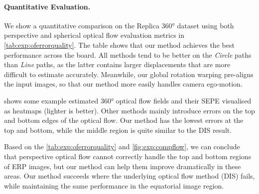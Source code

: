 \paragraph{Quantitative Evaluation.}

We show a quantitative comparison on the Replica 360° dataset using both perspective and spherical optical flow evaluation metrics in \cref{tab:exp:oferrorquality}.
%
The table
shows that our method achieves the best performance across the board.
%
All methods tend to be better on the \emph{Circle} paths than \emph{Line} paths, as the latter contains larger displacements that are more difficult to estimate accurately.
%
Meanwhile, our global rotation warping pre-aligns the input images, so that our method more easily handles camera ego-motion.


 shows some example estimated 360° optical flow fields and their SEPE visualised as heatmaps (lighter is better).
Other methods mainly introduce errors on the top and bottom edges of the optical flow.
Our method has the lowest errors at the top and bottom, while the middle region is quite similar to the DIS result.


Based on the \cref{tab:exp:oferrorquality} and \cref{fig:exp:compflow}, we can conclude that
%
perspective optical flow cannot correctly handle the top and bottom regions of ERP images, but our method can help them improve dramatically in these areas.
%
Our method succeeds where the underlying optical flow method (DIS) fails, while maintaining the same performance in the equatorial image region.



